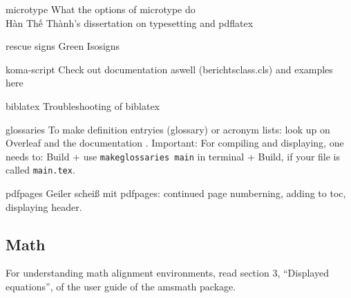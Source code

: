 \begin{macro}{microtype}
  What the options of microtype do \\
    H\`{a}n Th\'{\^{e}} Th\`{a}nh's dissertation on typesetting and pdflatex 
\end{macro}

\begin{macro}{rescue signs}
  Green Isosigns 
\end{macro}

\begin{macro}{koma-script}
  Check out documentation aswell (berichtsclass.cls) and examples here 
\end{macro}

\begin{macro}{biblatex}
  Troubleshooting of biblatex 
\end{macro}

\begin{macro}{glossaries}
  To make definition entryies (glossary) or acronym lists: look up on Overleaf  and the documentation . Important: For compiling and displaying, one needs to: Build + use \verb|makeglossaries main| in terminal + Build, if your file is called \verb|main.tex|. 
\end{macro}

\begin{macro}{pdfpages}
  Geiler scheiß mit pdfpages: continued page numberning, adding to toc, displaying header. 
\end{macro}

\subsection{Math}
For understanding math alignment environments, read section 3, \enquote{Displayed equations}, of the user guide of the amsmath package.  

